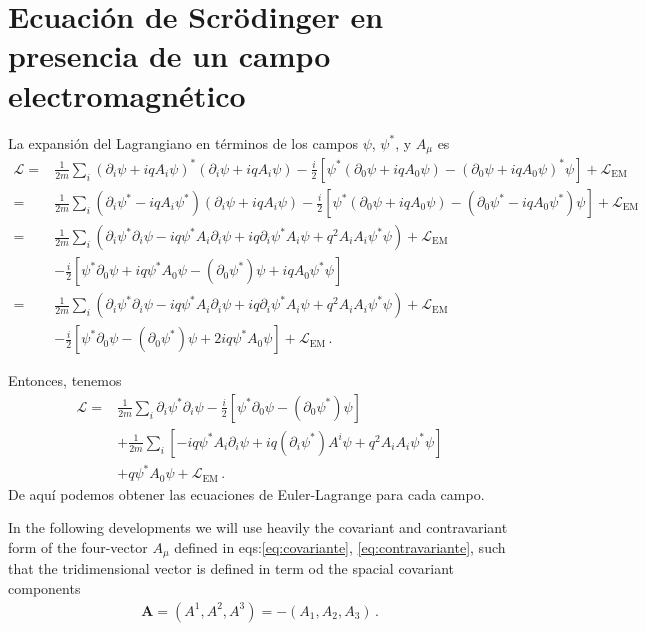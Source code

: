 \section{Ecuación de Scrödinger en presencia de un campo electromagnético}

La expansión del Lagrangiano en términos de los campos $\psi$, $\psi^*$, y $A_\mu$ es %
\begin{align}
\label{eq:178qft}
   \mathcal{L}
=&\frac{1}{2m}\sum_i\left(\partial_i\psi+i q A_i\psi\right)^*\left(\partial_i\psi+i q A_i\psi\right)-\frac{i}{2}
  \left[\psi^*\left(\partial_0\psi+i q A_0\psi\right)-\left(\partial_0\psi+i q A_0\psi\right)^*\psi\right]+\mathcal{L}_{\text{EM}} 
\nonumber\\
=&\frac{1}{2m}\sum_i\left(\partial_i\psi^*-i q A_i\psi^*\right)\left(\partial_i\psi+i q A_i\psi\right)-\frac{i}{2}
  \left[\psi^*\left(\partial_0\psi+i q A_0\psi\right)-\left(\partial_0\psi^*-i q A_0\psi^*\right)\psi\right]+\mathcal{L}_{\text{EM}}
\nonumber\\
 =&\frac{1}{2m}\sum_i\left(\partial_i\psi^*\partial_i\psi-i q \psi^*A_i\partial_i\psi+i q \partial_i\psi^*A_i\psi+q^2A_i A_i \psi^*\psi\right)
+\mathcal{L}_{\text{EM}}
\nonumber\\
 &-\frac{i}{2}
  \left[\psi^*\partial_0\psi+i q \psi^*A_0\psi-(\partial_0\psi^*)\psi+i q A_0\psi^*\psi\right]\nonumber\\
 =&\frac{1}{2m}\sum_i\left(\partial_i\psi^*\partial_i\psi-i q \psi^*A_i\partial_i\psi+i q \partial_i\psi^*A_i\psi+q^2A_i A_i \psi^*\psi\right)
+\mathcal{L}_{\text{EM}}
\nonumber\\
 &-\frac{i}{2}
  \left[\psi^*\partial_0\psi-(\partial_0\psi^*)\psi+2 i q \psi^*A_0\psi\right]+\mathcal{L}_{\text{EM}}\,.
 \end{align}

Entonces, tenemos
\begin{align}
  \mathcal{L}=&\frac{1}{2m}\sum_i\partial_i\psi^*\partial_i\psi
-\frac{i}{2}
  \left[\psi^*\partial_0\psi-(\partial_0\psi^*)\psi\right] \nonumber\\
&+\frac{1}{2m}\sum_i\left[ -i q \psi^*A_i\partial_i\psi+i q \left(\partial_i\psi^*\right) A^i\psi+q^2A_i A_i \psi^*\psi\right]\nonumber\\
 &+ q \psi^*A_0\psi+\mathcal{L}_{\text{EM}}\,.
 \end{align}
De aquí podemos obtener las ecuaciones de Euler-Lagrange para cada campo.



In the following developments we will use heavily  the covariant and contravariant form of the four-vector $A_{\mu}$ defined in eqs:\eqref{eq:covariante}, \eqref{eq:contravariante}, such that the tridimensional vector is defined in term od the spacial covariant components
\begin{align*}
  \mathbf{A}=\left( A^1,A^2,A^3\right)=-\left( A_1,A_2,A_3\right)\,.
\end{align*}

